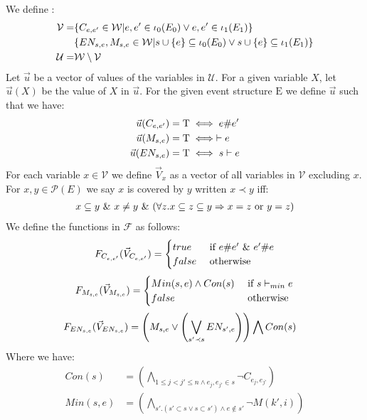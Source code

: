 We define :
\begin{align*}
    \mathcal{V} = &
    \{C_{e,e'} \in \mathcal{W}| e,e' \in \iota_0(E_0) \vee e,e' \in \iota_1(E_1)\}              \\
                  & \{EN_{s,e},M_{s,e} \in \mathcal{W}| s\cup\{e\} \subseteq \iota_0(E_0) \vee
    s \cup \{e\}  \subseteq \iota_1(E_1)
    \}                                                                                           \\
    \mathcal{U} = & \mathcal{W} \setminus \mathcal{V}
\end{align*}
Let $\vec u$ be a vector of values of the variables in $\mathcal{U}$.
For a given variable $X$, let $\vec u(X)$ be the value of $X$ in $\vec u$.
For the given event structure $\mathrm{E}$ we define $\vec u$ such that we have:
\begin{align*}
    \vec u(C_{e,e'}) & = \mathrm{T}  \iff e\#e'      \\
    \vec u(M_{s,e})  & = \mathrm{T}   \iff \vdash e  \\
    \vec u(EN_{s,e}) & = \mathrm{T}  \iff s \vdash e
\end{align*}
For each variable $x \in \mathcal{V}$ we define $\vec V_x$ as a vector
of all variables in $\mathcal{V}$ excluding $x$.
For $x,y \in \mathcal{P}(E)$ we say $x$ is covered by $y$ written $ x \prec y$ iff:
\begin{align*}
    x \subseteq y \ \& \  x \neq y \ \& \ 
    (\forall z. x \subseteq z \subseteq y \Rightarrow x = z
    \text{ or } y = z)
\end{align*}
We define the functions in $\mathscr{F}$ as follows:
$$
    F_{C_{e,e'}}(\vec V_{C_{e,e'}}) = \begin{cases}
        true  & \text{ if } e \# e' \ \& \  e' \# e \\
        false & \text{ otherwise }
    \end{cases}
$$
$$
    F_{M_{s,e}}(\vec V_{M_{s,e}}) = \begin{cases}
        Min(s,e) \wedge Con(s) & \text{ if } s \vdash_{min} e \\
        false                  & \text{ otherwise }
    \end{cases}
$$
\begin{align*}
    F_{EN_{s,e}}(\vec V_{EN_{s,e}}) & =
    \left(
    M_{s,e} \vee
    \left(
    \bigvee_{s'\prec s}EN_{s',e}
    \right)
    \right)
    \bigwedge
    Con(s)
\end{align*}
Where we have:
\begin{align*}
    Con(s)   & =   \left(
    \bigwedge_{ 1\leq j<j' \leq n \wedge e_j,e_{j'} \in s}
    \neg C_{e_j,e_{j'}}
    \right)               \\
    Min(s,e) & = \left(
    \bigwedge_{s'. (s' \subset s \vee s \subset s')
        \wedge e \notin s'}
    \neg M(k',i)
    \right)
\end{align*}
